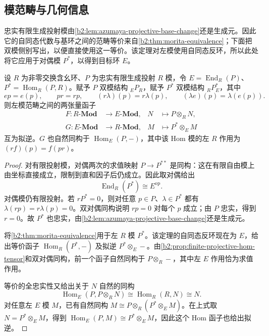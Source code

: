 \subsection{模范畴与几何信息}
\label{b2:subsec:C04:02}

忠实有限生成投射模由\cref{b2:lem:azumaya-projective-base-change}还是生成元。因此它的自同态代数与基环之间的范畴等价来自\cref{b2:thm:morita-equivalence}；下面把双模侧别写出，以便直接使用这一等价。该定理对左模使用自同态反环，所以此处将它应用于对偶模 \(P^*\)，以得到目标环 \(E\)。

\begin{proposition}\label{b2:prop:split-azumaya-morita}
	设 \(R\) 为非零交换含幺环、\(P\) 为忠实有限生成投射 \(R\) 模，令 \(E=\operatorname{End}_R(P)\)、\(P^*=\operatorname{Hom}_R(P,R)\)。赋予 \(P\) 双模结构 \({}_EP_R\)，赋予 \(P^*\) 双模结构 \({}_RP^*_E\)，其中
	\[
		ep=e(p),\qquad pr=rp,\qquad (r\lambda)(p)=r\lambda(p),\qquad (\lambda e)(p)=\lambda(e(p)).
	\]
	则左模范畴之间的两张量函子
	\[
		\begin{aligned}
			F:R\text{-}\mathbf{Mod}&\longrightarrow E\text{-}\mathbf{Mod}, &N&\longmapsto P\otimes_RN,\\
			G:E\text{-}\mathbf{Mod}&\longrightarrow R\text{-}\mathbf{Mod}, &M&\longmapsto P^*\otimes_EM
		\end{aligned}
	\]
	互为拟逆。\(G\) 也自然同构于 \(\operatorname{Hom}_E(P,-)\)，其中该 Hom 模的左 \(R\) 作用为 \((rf)(p)=f(pr)\)。
\end{proposition}
\begin{proof}
	对有限投射模，对偶两次的求值映射 \(P\rightarrow P^{**}\) 是同构：这在有限自由模上由坐标直接成立，限制到直和因子后仍成立。因此取对偶给出
	\[
		\operatorname{End}_R(P^*)\cong E^{\mathrm{op}}.
	\]
	对偶模仍有限投射。若 \(rP^*=0\)，则对任意 \(p\in P\)、\(\lambda\in P^*\) 都有 \(\lambda(rp)=r\lambda(p)=0\)。双对偶同构说明 \(rp=0\) 对每个 \(p\) 成立；由 \(P\) 忠实，得到 \(r=0\)。故 \(P^*\) 也忠实，由\cref{b2:lem:azumaya-projective-base-change}还是生成元。

	将\cref{b2:thm:morita-equivalence}用于左 \(R\) 模 \(P^*\)。该定理的自同态反环现在为 \(E\)，给出等价函子 \(\operatorname{Hom}_R(P^*,-)\) 及拟逆 \(P^*\otimes_E-\)。由\cref{b2:prop:finite-projective-hom-tensor}和双对偶同构，前一个函子自然同构于 \(P\otimes_R-\)，其中左 \(E\) 作用恰为求值作用。

	等价的全忠实性又给出关于 \(N\) 自然的同构
	\[
		\operatorname{Hom}_E(P,P\otimes_RN) \cong\operatorname{Hom}_R(R,N)\cong N.
	\]
	对任意左 \(E\) 模 \(M\)，已有自然同构 \(M\cong P\otimes_R(P^*\otimes_EM)\)。在上式取 \(N=P^*\otimes_EM\)，得到 \(\operatorname{Hom}_E(P,M)\cong P^*\otimes_EM\)，因此这个 Hom 函子也给出拟逆。
\end{proof}

